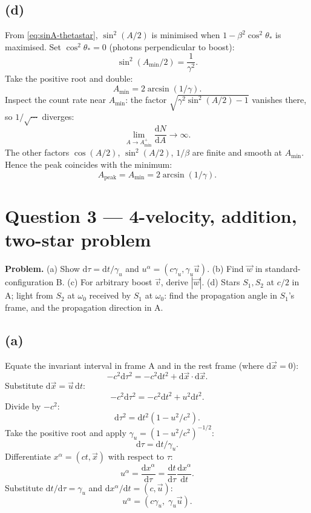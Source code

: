 \documentclass[11pt]{article}
\newcommand{\de}{\mathrm{d}}
\begin{document}
\subsection*{(d)}
From \eqref{eq:sinA-thetastar}, $\sin^{2}(A/2)$ is minimised when $1-\beta^{2}\cos^{2}\theta_{*}$ is maximised. Set $\cos^{2}\theta_{*}=0$ (photons perpendicular to boost):
\[ \sin^{2}(A_{\min}/2)=\frac{1}{\gamma^{2}}. \]
Take the positive root and double:
\[ \boxed{\;A_{\min}=2\arcsin(1/\gamma).\;} \]
Inspect the count rate near $A_{\min}$: the factor $\sqrt{\gamma^{2}\sin^{2}(A/2)-1}$ vanishes there, so $1/\sqrt{\cdots}$ diverges:
\[ \lim_{A\to A_{\min}^{+}}\frac{\de N}{\de A}\to\infty. \]
The other factors $\cos(A/2)$, $\sin^{2}(A/2)$, $1/\beta$ are finite and smooth at $A_{\min}$. Hence the peak coincides with the minimum:
\[ \boxed{\;A_{\mathrm{peak}}=A_{\min}=2\arcsin(1/\gamma).\;} \]

\begin{center}
\end{center}

\section*{Question 3 --- 4-velocity, addition, two-star problem}

\textbf{Problem.} (a) Show $\de\tau=\de t/\gamma_{u}$ and $u^{\alpha}=(c\gamma_{u},\gamma_{u}\vec u)$. (b) Find $\vec w$ in standard-configuration B. (c) For arbitrary boost $\vec v$, derive $|\vec w|$. (d) Stars $S_{1},S_{2}$ at $c/2$ in A; light from $S_{2}$ at $\omega_{0}$ received by $S_{1}$ at $\omega_{0}$: find the propagation angle in $S_{1}$'s frame, and the propagation direction in A.

\subsection*{(a)}
Equate the invariant interval in frame A and in the rest frame (where $\de\vec x=0$):
\[ -c^{2}\de\tau^{2}=-c^{2}\de t^{2}+\de\vec x\cdot\de\vec x. \]
Substitute $\de\vec x=\vec u\,\de t$:
\[ -c^{2}\de\tau^{2}=-c^{2}\de t^{2}+u^{2}\de t^{2}. \]
Divide by $-c^{2}$:
\[ \de\tau^{2}=\de t^{2}(1-u^{2}/c^{2}). \]
Take the positive root and apply $\gamma_{u}=(1-u^{2}/c^{2})^{-1/2}$:
\[ \boxed{\;\de\tau=\de t/\gamma_{u}.\;} \]
Differentiate $x^{\alpha}=(ct,\vec x)$ with respect to $\tau$:
\[ u^{\alpha}=\frac{\de x^{\alpha}}{\de\tau}=\frac{\de t}{\de\tau}\frac{\de x^{\alpha}}{\de t}. \]
Substitute $\de t/\de\tau=\gamma_{u}$ and $\de x^{\alpha}/\de t=(c,\vec u)$:
\[ \boxed{\;u^{\alpha}=(c\gamma_{u},\;\gamma_{u}\vec u).\;} \]
\end{document}
